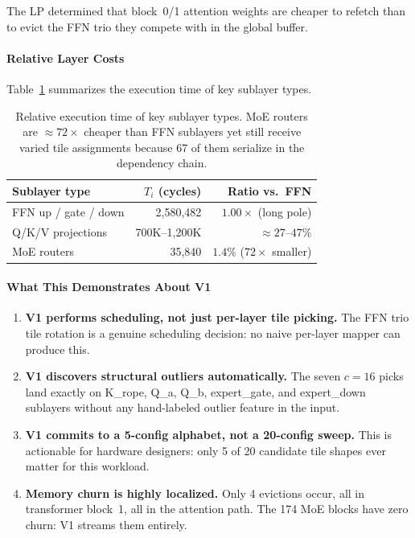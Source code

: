 \noindent The LP determined that block~0/1 attention weights are cheaper to refetch than to evict the FFN trio they compete with in the global buffer.

\paragraph{Relative Layer Costs}
Table~\ref{tab:ds_layer_costs} summarizes the execution time of key sublayer types.
\begin{table}[h]
\centering
\caption{Relative execution time of key sublayer types. MoE routers
are ${\approx}72\times$ cheaper than FFN sublayers yet still receive varied tile assignments because 67 of them serialize in the dependency chain.}
\label{tab:ds_layer_costs}
\begin{tabular}{lrr}
\toprule
\textbf{Sublayer type} & \textbf{$T_i$ (cycles)} &
\textbf{Ratio vs.\ FFN} \\
\midrule
FFN up / gate / down & 2{,}580{,}482 & $1.00\times$ (long pole) \\
Q/K/V projections    & 700K–1{,}200K & ${\approx}27$–$47\%$ \\
MoE routers          & 35{,}840      & $1.4\%$ ($72\times$ smaller) \\
\bottomrule
\end{tabular}
\end{table}

\paragraph{What This Demonstrates About V1}

\begin{enumerate}

    \item \textbf{V1 performs scheduling, not just per-layer tile
          picking.} The FFN trio tile rotation is a genuine scheduling decision: no naive per-layer mapper can produce this.

    \item \textbf{V1 discovers structural outliers automatically.}
          The seven $c=16$ picks land exactly on K\_rope, Q\_a, Q\_b,
          expert\_gate, and expert\_down sublayers without any
          hand-labeled outlier feature in the input.

    \item \textbf{V1 commits to a 5-config alphabet, not a 20-config
          sweep.} This is actionable for hardware designers: only 5 of
          20 candidate tile shapes ever matter for this workload.

    \item \textbf{Memory churn is highly localized.} Only 4 evictions
          occur, all in transformer block~1, all in the attention path.
          The 174 MoE blocks have zero churn: V1 streams them entirely.

\end{enumerate}

